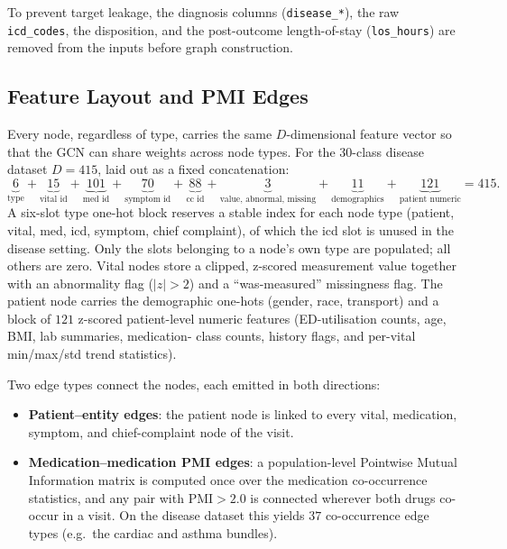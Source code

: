 To prevent target leakage, the diagnosis columns (\texttt{disease\_*}), the raw
\texttt{icd\_codes}, the disposition, and the post-outcome length-of-stay
(\texttt{los\_hours}) are removed from the inputs before graph construction.

\subsection{Feature Layout and PMI Edges}

Every node, regardless of type, carries the same $D$-dimensional feature vector
so that the GCN can share weights across node types. For the 30-class disease
dataset $D = 415$, laid out as a fixed concatenation:
\[
  \underbrace{6}_{\text{type}}
  + \underbrace{15}_{\text{vital id}}
  + \underbrace{101}_{\text{med id}}
  + \underbrace{70}_{\text{symptom id}}
  + \underbrace{88}_{\text{cc id}}
  + \underbrace{3}_{\text{value, abnormal, missing}}
  + \underbrace{11}_{\text{demographics}}
  + \underbrace{121}_{\text{patient numeric}}
  = 415 .
\]
A six-slot type one-hot block reserves a stable index for each node type
(patient, vital, med, icd, symptom, chief complaint), of which the icd slot is
unused in the disease setting. Only the slots belonging to a node's own type are
populated; all others are zero. Vital nodes store a clipped, z-scored
measurement value together with an abnormality flag ($|z| > 2$) and a
``was-measured'' missingness flag. The patient node carries the demographic
one-hots (gender, race, transport) and a block of $121$ z-scored patient-level
numeric features (ED-utilisation counts, age, BMI, lab summaries, medication-%
class counts, history flags, and per-vital min/max/std trend statistics).

Two edge types connect the nodes, each emitted in both directions:

\begin{itemize}
  \item \textbf{Patient--entity edges}: the patient node is linked to every
        vital, medication, symptom, and chief-complaint node of the visit.
  \item \textbf{Medication--medication PMI edges}: a population-level Pointwise
        Mutual Information matrix is computed once over the medication
        co-occurrence statistics, and any pair with $\mathrm{PMI} > 2.0$ is
        connected wherever both drugs co-occur in a visit. On the disease
        dataset this yields $37$ co-occurrence edge types (e.g.\ the cardiac and
        asthma bundles).
\end{itemize}


